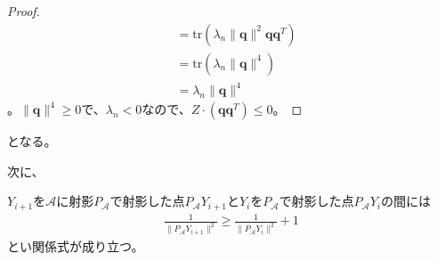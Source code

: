\begin{proof}
\begin{align*}
                                      & = \mathrm{tr}(\lambda_n \|\mathbf{q}\|^2 \mathbf{q} \mathbf{q}^T) \\
                                      & = \mathrm{tr}(\lambda_n \|\mathbf{q}\|^4) \\
                                      & = \lambda_n \|\mathbf{q}\|^4
  \end{align*}
  。$\|\mathbf{q}\|^4 \geq 0$で、$\lambda_n < 0$なので、$Z \cdot (\mathbf{q} \mathbf{q}^T) \leq 0$。
\end{proof}
となる。

次に、
\begin{lemma*}
  $Y_{i + 1}$を$\mathcal{A}$に射影$P_\mathcal{A}$で射影した点$P_\mathcal{A} Y_{i + 1}$と$Y_i$を$P_\mathcal{A}$で射影した点$P_\mathcal{A} Y_i$の間には
  \begin{align*}
    \frac{1}{\|P_\mathcal{A} Y_{i + 1}\|^2} \geq \frac{1}{\|P_\mathcal{A} Y_i\|^2} + 1
  \end{align*}
  とい関係式が成り立つ。
\end{lemma*}
